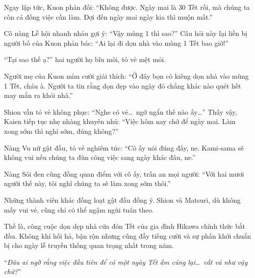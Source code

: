 \documentclass[../main.tex]{subfiles}
\begin{document}
Ngay lập tức, Kuon phản đối: ``Không được. Ngày mai là 30 Tết rồi, mà chúng ta còn cả đống việc cần làm. Đợi đến ngày mai ngày kia thì muộn mất.''

Cô nàng Lễ hội nhanh nhảu gợi ý: ``Vậy mùng 1 thì sao?'' Câu hỏi này lại liền bị người bố của Kuon phản bác: ``Ai lại đi dọn nhà vào mùng 1 Tết bao giờ!''

``Tại sao thế ạ?'' hai người họ bĩu môi, tỏ vẻ mệt mỏi.

Người mẹ của Kuon mỉm cười giải thích: ``Ở đây bọn cô kiêng dọn nhà vào mùng 1 Tết, cháu à. Người ta tin rằng dọn dẹp vào ngày đó chẳng khác nào quét hết may mắn ra khỏi nhà.''

Shion vẫn tỏ vẻ không phục: ``Nghe có vẻ\dots\ ngớ ngẩn thế nào ấy\dots'' Thấy vậy, Kaien tiếp tục nhẹ nhàng khuyên nhủ: ``Việc hôm nay chớ để ngày mai. Làm xong sớm thì nghỉ sớm, đúng không?''

Nàng Vu nữ gật đầu, tỏ vẻ nghiêm túc: ``Cô ấy nói đúng đấy, ne. Kami-sama sẽ không vui nếu chúng ta đùn công việc sang ngày khác đâu, ne.''

Nàng Sói đen cũng đồng quan điểm với cô ấy, trấn an mọi người: ``Với hai mươi người thế này, tôi nghĩ chúng ta sẽ làm xong sớm thôi.''

Những thành viên khác đồng loạt gật đầu đồng ý. Shion và Matsuri, dù không mấy vui vẻ, cũng chỉ có thể ngậm ngùi tuân theo.

Thế là, công cuộc dọn dẹp nhà cửa đón Tết của gia đình Hikawa chính thức bắt đầu. Không khí hối hả, bận rộn nhưng cũng đầy tiếng cười và sự phấn khởi chuẩn bị cho ngày lễ truyền thống quan trọng nhất trong năm.

``\textit{Đâu ai ngờ rằng việc đầu tiên để có một ngày Tết ấm cúng lại\dots\ vất vả như vậy chứ?}''
\end{document}
